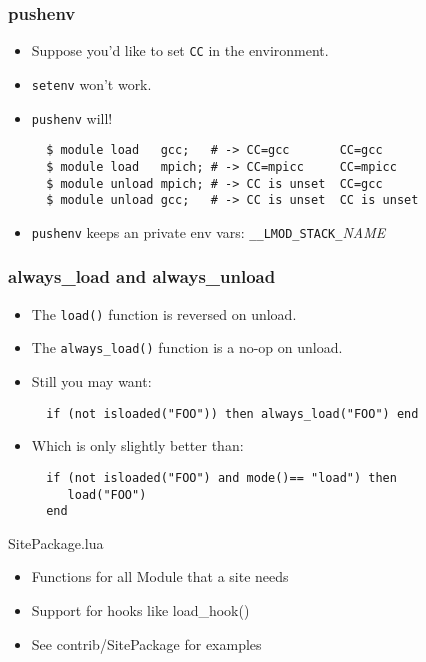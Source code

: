 \documentclass[dvipsnames,aspectratio=169]{beamer}
\begin{document}
\begin{frame}[fragile]
    \frametitle{pushenv}
  \begin{itemize}
    \item Suppose you'd like to set \texttt{CC} in the environment.
    \item \texttt{setenv} won't work.
    \item \texttt{pushenv} will!
    {\small
\begin{verbatim}
  $ module load   gcc;   # -> CC=gcc       CC=gcc
  $ module load   mpich; # -> CC=mpicc     CC=mpicc
  $ module unload mpich; # -> CC is unset  CC=gcc
  $ module unload gcc;   # -> CC is unset  CC is unset
\end{verbatim}
}
    \item \texttt{pushenv} keeps an private env vars: \texttt{\_\_LMOD\_STACK\_}\emph{NAME}
  \end{itemize}
\end{frame}

\begin{frame}[fragile]
    \frametitle{always\_load and always\_unload}
  \begin{itemize}
    \item The \texttt{load()} function is reversed on unload.
    \item The \texttt{always\_load()} function is a no-op on unload.
    \item Still you may want:
    {\small
\begin{verbatim}
  if (not isloaded("FOO")) then always_load("FOO") end
\end{verbatim}
}
    \item Which is only slightly better than:
    {\small
\begin{verbatim}
  if (not isloaded("FOO") and mode()== "load") then
     load("FOO")
  end
\end{verbatim}
}
  \end{itemize}
\end{frame}

\begin{frame}{SitePackage.lua}
  \begin{itemize}
    \item Functions for all Module that a site needs
    \item Support for hooks like load\_hook()
    \item See contrib/SitePackage for examples
  \end{itemize}
\end{frame}
\end{document}
